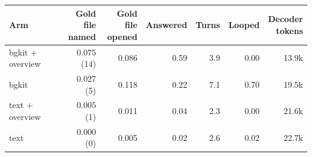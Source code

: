 \begin{tabular}{lrrrrrr}
\toprule
Arm & \shortstack{Gold file\\named} & \shortstack{Gold file\\opened} & Answered & Turns & Looped & \shortstack{Decoder\\tokens} \\
\midrule
bgkit + overview & 0.075 (14) & 0.086 & 0.59 & 3.9 & 0.00 & 13.9k \\
bgkit & 0.027 (5) & 0.118 & 0.22 & 7.1 & 0.70 & 19.5k \\
text + overview & 0.005 (1) & 0.011 & 0.04 & 2.3 & 0.00 & 21.6k \\
text & 0.000 (0) & 0.005 & 0.02 & 2.6 & 0.02 & 22.7k \\
\bottomrule
\end{tabular}
